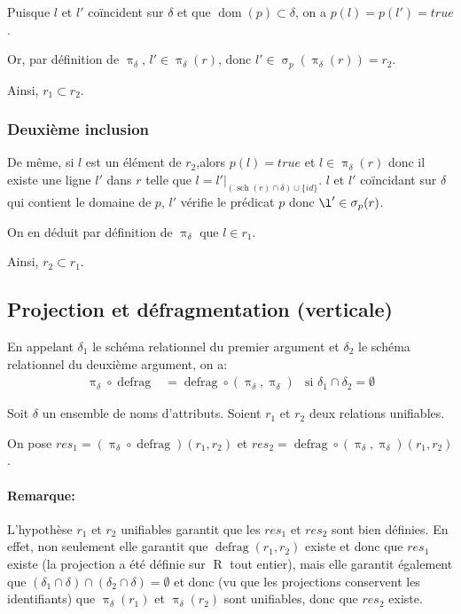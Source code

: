 \documentclass[french]{article}
\DeclareMathOperator{\proj}{\pi}
\DeclareMathOperator{\sel}{\sigma}
\DeclareMathOperator{\defrag}{defrag}
\DeclareMathOperator{\dom}{dom}
\DeclareMathOperator{\R}{R}
\DeclareMathOperator{\s}{sch}
\newcommand{\projDelta}{\proj_{\delta}}
\newcommand{\selP}{\sel_p}
\newcommand{\cip}{\cup \{id\}}
\newcommand{\dintro}{De même, si $l$ est un élément de $r_2$,}
\begin{document}
Puisque $l$ et $l'$ coïncident sur $\delta$
et que $\dom(p) \subset \delta$,
on a $p(l) = p(l') = true$.

Or, par définition de $\projDelta$, $l' \in \projDelta(r)$,
donc $l' \in \selP(\projDelta(r)) = r_2$.

Ainsi,
$r_1 \subset r_2$.

\subsubsection*{Deuxième inclusion}
\dintro alors $p(l) = true$ et $l \in \projDelta(r)$
donc il existe une ligne $l'$ dans $r$ telle que 
$l = l'|_{(\s(r)\cap \delta) \cip}$.
$l$ et $l'$ coïncidant sur $\delta$ qui contient
le domaine de $p$, $l'$ vérifie le prédicat $p$
donc $\l' \in \selP(r)$.

On en déduit par définition de $\projDelta$ que
$l \in r_1$.

Ainsi, $r_2 \subset r_1$.

\subsection*{Projection et défragmentation (verticale)}
En appelant $\delta_1$ le schéma relationnel du premier
argument et $\delta_2$ le schéma relationnel du deuxième
argument, on a:
\begin{align}
\projDelta \circ \defrag
& = \defrag \circ (\projDelta, \projDelta)
& \text{si $\delta_1 \cap \delta_2 = \emptyset$}
\end{align}

Soit $\delta$ un ensemble de noms d'attributs.
Soient $r_1$ et $r_2$ deux relations unifiables.

On pose ${res}_1 = (\projDelta \circ \defrag) (r_1, r_2)$
et ${res}_2 = \defrag \circ (\projDelta, \proj_\delta) (r_1, r_2)$.

\paragraph*{Remarque:}
L'hypothèse \og $r_1$ et $r_2$ unifiables \fg{} garantit que
les ${res}_1$ et ${res}_2$ sont bien définies.
En effet, non seulement elle garantit que $\defrag(r_1, r_2)$ existe et donc
que $res_1$ existe (la projection a été définie sur $\R$ tout entier),
mais elle garantit également que $(\delta_1 \cap \delta) \cap (\delta_2 \cap \delta) = \emptyset$
et donc (vu que les projections conservent les identifiants) que
$\projDelta(r_1)$ et $\projDelta(r_2)$ sont unifiables, donc que $res_2$ existe.
\end{document}
